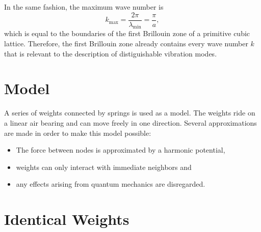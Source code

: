 In the same fashion, the maximum wave number is
\begin{equation*}
	k_\text{max}=\frac{2\pi}{\lambda_\text{min}}=\frac{\pi}{a},
\end{equation*}
which is equal to the boundaries of the first Brillouin zone of a primitive cubic lattice.
Therefore, the first Brillouin zone already contains every wave number $k$ that is relevant to the description of distiguishable vibration modes.

\section{Model}
A series of weights connected by springs is used as a model.
The weights ride on a linear air bearing and can move freely in one direction.
Several approximations are made in order to make this model possible:
\begin{itemize}
	\item The force between nodes is approximated by a harmonic potential,
	\item weights can only interact with immediate neighbors and
	\item any effects arising from quantum mechanics are disregarded.
\end{itemize}

\section{Identical Weights}\label{sec:single_theory}
